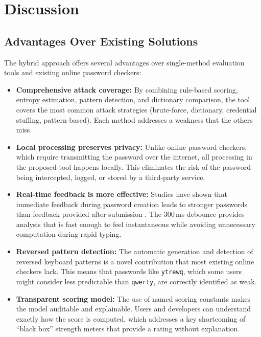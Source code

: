 \clearpage

\section{Discussion}

\subsection{Advantages Over Existing Solutions}

The hybrid approach offers several advantages over single-method evaluation tools and existing online password checkers:

\begin{itemize}
    \item \textbf{Comprehensive attack coverage:} By combining rule-based scoring, entropy estimation, pattern detection, and dictionary comparison, the tool covers the most common attack strategies (brute-force, dictionary, credential stuffing, pattern-based). Each method addresses a weakness that the others miss.

    \item \textbf{Local processing preserves privacy:} Unlike online password checkers, which require transmitting the password over the internet, all processing in the proposed tool happens locally. This eliminates the risk of the password being intercepted, logged, or stored by a third-party service.

    \item \textbf{Real-time feedback is more effective:} Studies have shown that immediate feedback during password creation leads to stronger passwords than feedback provided after submission \cite{proctor2002}. The 300\,ms debounce provides analysis that is fast enough to feel instantaneous while avoiding unnecessary computation during rapid typing.

    \item \textbf{Reversed pattern detection:} The automatic generation and detection of reversed keyboard patterns is a novel contribution that most existing online checkers lack. This means that passwords like \texttt{ytrewq}, which some users might consider less predictable than \texttt{qwerty}, are correctly identified as weak.

    \item \textbf{Transparent scoring model:} The use of named scoring constants makes the model auditable and explainable. Users and developers can understand exactly how the score is computed, which addresses a key shortcoming of ``black box'' strength meters that provide a rating without explanation.


\end{itemize}
